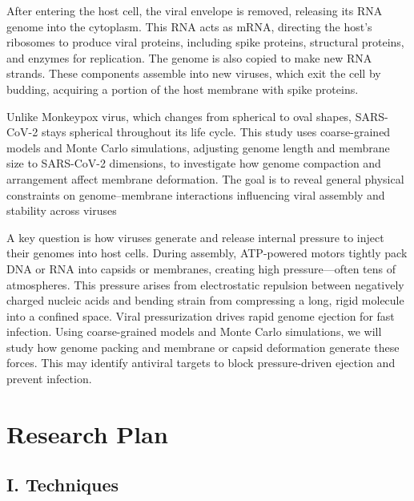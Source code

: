 \documentclass[12pt]{article}
\begin{document}
\begin{flushleft}
After entering the host cell, the viral envelope is removed, releasing its  RNA genome into the cytoplasm. This RNA acts as mRNA, directing the host’s ribosomes to produce viral proteins, including spike proteins, structural proteins, and enzymes for replication. The genome is also copied to make new RNA strands. These components assemble into new viruses, which exit the cell by budding, acquiring a portion of the host membrane with spike proteins. 
 
Unlike Monkeypox virus, which changes from spherical to oval shapes, SARS-CoV-2 stays spherical throughout its life cycle. This study uses coarse-grained models and Monte Carlo simulations, adjusting genome length and membrane size to SARS-CoV-2 dimensions, to investigate how genome compaction and arrangement affect membrane deformation. The goal is to reveal general physical constraints on genome–membrane interactions influencing viral assembly and stability across viruses


A key question is how viruses generate and release internal pressure to inject their genomes into host cells. During assembly, ATP-powered motors tightly pack DNA or RNA into capsids or membranes, creating high pressure—often tens of atmospheres. This pressure arises from electrostatic repulsion between negatively charged nucleic acids and bending strain from compressing a long, rigid molecule into a confined space\cite{BrandarizNunez2019}. Viral pressurization drives rapid genome ejection for fast infection. Using coarse-grained models and Monte Carlo simulations, we will study how genome packing and membrane or capsid deformation generate these forces. This may identify antiviral targets to block pressure-driven ejection and prevent infection.

\section*{Research Plan}
\subsection*{I. Techniques}
 \subsection*{}






\end{flushleft}
\end{document}
